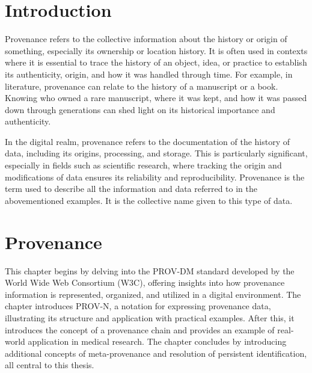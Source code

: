 \documentclass[
  digital,     %
  oneside,     %
  nosansbold,  %
  nocolorbold, %
  lof,         %
  lot,         %
]{fithesis4}
\begin{document}
\chapter*{Introduction}
\shorthandoff{-}
Provenance refers to the collective information about the history or origin of something, especially its ownership or location history. It is often used in contexts where it is essential to trace the history of an object, idea, or practice to establish its authenticity, origin, and how it was handled through time. For example, in literature, provenance can relate to the history of a manuscript or a book. Knowing who owned a rare manuscript, where it was kept, and how it was passed down through generations can shed light on its historical importance and authenticity.

In the digital realm, provenance refers to the documentation of the history of data, including its origins, processing, and storage. This is particularly significant, especially in fields such as scientific research, where tracking the origin and modifications of data ensures its reliability and reproducibility. Provenance is the term used to describe all the information and data referred to in the abovementioned examples. It is the collective name given to this type of data.
\shorthandon{-}

\chapter{Provenance}
This chapter begins by delving into the PROV-DM standard developed by the World Wide Web Consortium (W3C), offering insights into how provenance information is represented, organized, and utilized in a digital environment. The chapter introduces PROV-N, a notation for expressing provenance data, illustrating its structure and application with practical examples. After this, it introduces the concept of a provenance chain and provides an example of real-world application in medical research. The chapter concludes by introducing additional concepts of meta-provenance and resolution of persistent identification, all central to this thesis.
\end{document}
